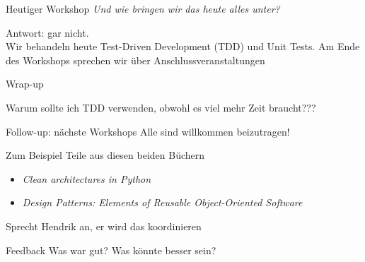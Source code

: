 \documentclass{beamer}
\begin{document}
\begin{frame}{Heutiger Workshop}
 \emph{Und wie bringen wir das heute alles unter?}
 
 \vspace{10pt}
 
 Antwort: gar nicht.\\ Wir behandeln heute Test-Driven Development (TDD) und Unit Tests. Am Ende des Workshops sprechen wir über Anschlussveranstaltungen
\end{frame}





\begin{frame}{Wrap-up}

\centering \LARGE Warum sollte ich TDD verwenden, obwohl es viel mehr Zeit braucht???
 
\end{frame}


\begin{frame}{Follow-up: nächste Workshops}
Alle sind willkommen beizutragen!

\vspace{15pt}

Zum Beispiel Teile aus diesen beiden Büchern
 \begin{itemize}
  \item \emph{Clean architectures in Python}
  \item \emph{Design Patterns: Elements of Reusable Object-Oriented Software}
 \end{itemize}

 \vspace{15pt}
 
 Sprecht Hendrik an, er wird das koordinieren
 
\end{frame}


\begin{frame}{Feedback}
\LARGE Was war gut? Was könnte besser sein? 
\end{frame}
\end{document}
